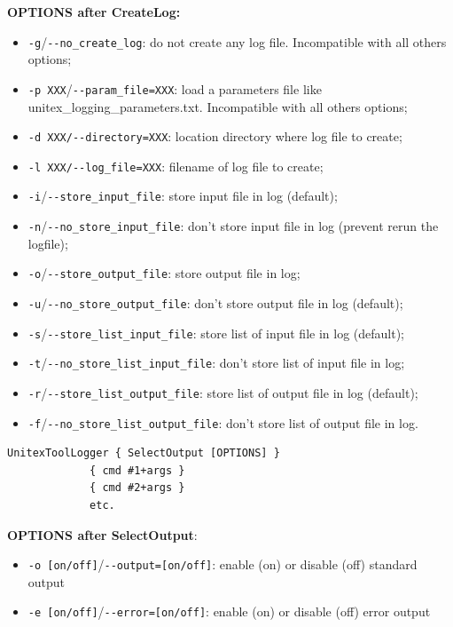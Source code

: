 \bigskip
\noindent \textbf{OPTIONS after CreateLog:}
\begin{itemize}
  \item \verb+-g+/\verb+--no_create_log+: do not create any log file. Incompatible with all others options;

  \item \verb+-p XXX+/\verb+--param_file=XXX+: load a parameters file like unitex\_logging\_parameters.txt. Incompatible with all others options;

  \item \verb+-d XXX/--directory=XXX+: location directory where log file to create;
  \item \verb+-l XXX/--log_file=XXX+: filename of log file to create;
  \item \verb+-i+/\verb+--store_input_file+: store input file in log (default);
  \item \verb+-n+/\verb+--no_store_input_file+: don't store input file in log (prevent rerun the logfile);
  \item \verb+-o+/\verb+--store_output_file+: store output file in log;
  \item \verb+-u+/\verb+--no_store_output_file+: don't store output file in log (default);
  \item \verb+-s+/\verb+--store_list_input_file+: store list of input file in log (default);
  \item \verb+-t+/\verb+--no_store_list_input_file+: don't store list of input file in log;
  \item \verb+-r+/\verb+--store_list_output_file+: store list of output file in log (default);
  \item \verb+-f+/\verb+--no_store_list_output_file+: don't store list of output file in log.
\end{itemize}

\bigskip
\begin{verbatim}
UnitexToolLogger { SelectOutput [OPTIONS] } 
             { cmd #1+args } 
             { cmd #2+args }
             etc.
\end{verbatim}

\bigskip
\noindent \textbf{OPTIONS after SelectOutput}:
\begin{itemize}
\item \verb+-o [on/off]+/\verb+--output=[on/off]+: enable (on) or disable (off) standard output
\item \verb+-e [on/off]+/\verb+--error=[on/off]+: enable (on) or disable (off) error output
\end{itemize}


